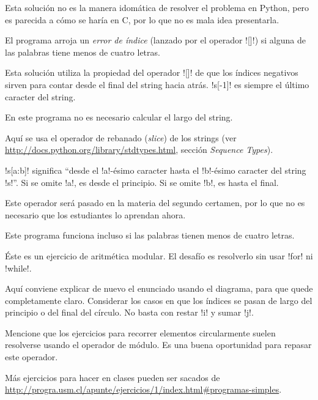 \documentclass[10pt]{article}
\begin{document}
  Esta solución no es la manera idomática
  de resolver el problema en Python,
  pero es parecida a cómo se haría en C,
  por lo que no es mala idea presentarla.

  El programa arroja un \emph{error de índice}
  (lanzado por el operador \li![]!)
  si alguna de las palabras tiene menos de cuatro letras.


  Esta solución utiliza la propiedad del operador \li![]!
  de que los índices negativos sirven para contar
  desde el final del string hacia atrás.
  \li!s[-1]! es siempre el último caracter del string.

  En este programa no es necesario calcular el largo del string.


  Aquí se usa el operador de rebanado (\emph{slice})
  de los strings (ver \url{http://docs.python.org/library/stdtypes.html}, sección \emph{Sequence Types}).

  \li!s[a:b]! significa ``desde el \li!a!-ésimo caracter hasta el \li!b!-ésimo caracter
  del string \li!s!''.
  Si se omite \li!a!, es desde el principio. Si se omite \li!b!, es hasta el final.
  
  Este operador será pasado en la materia del segundo certamen,
  por lo que no es necesario que los estudiantes lo aprendan ahora.

  Este programa funciona incluso si las palabras tienen menos de cuatro letras.


  Éste es un ejercicio de aritmética modular.
  El desafío es resolverlo sin usar \li!for! ni \li!while!.


  Aquí conviene explicar de nuevo el enunciado usando el diagrama,
  para que quede completamente claro.
  Considerar los casos en que los índices se pasan de largo
  del principio o del final del círculo.
  No basta con restar \li!i! y sumar \li!j!.


  Mencione que los ejercicios para recorrer elementos circularmente
  suelen resolverse usando el operador de módulo.
  Es una buena oportunidad para repasar este operador.

  Más ejercicios para hacer en clases
  pueden ser sacados de \url{http://progra.usm.cl/apunte/ejercicios/1/index.html#programas-simples}.
\end{document}
